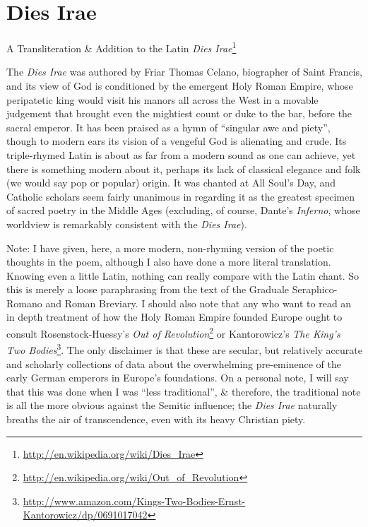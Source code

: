 \section{Dies Irae}

A Transliteration \& Addition to the Latin \emph{Dies Irae}\footnote{\url{http://en.wikipedia.org/wiki/Dies\_Irae}}


\begin{quotex}
The \emph{Dies Irae} was authored by Friar Thomas Celano, biographer of Saint Francis, and its view of God is conditioned by the emergent Holy Roman Empire, whose peripatetic king would visit his manors all across the West in a movable judgement that brought even the mightiest count or duke to the bar, before the sacral emperor. It has been praised as a hymn of ``singular awe and piety'', though to modern ears its vision of a vengeful God is alienating and crude. Its triple-rhymed Latin is about as far from a modern sound as one can achieve, yet there is something modern about it, perhaps its lack of classical elegance and folk (we would say pop or popular) origin. It was chanted at All Soul's Day, and Catholic scholars seem fairly unanimous in regarding it as the greatest specimen of sacred poetry in the Middle Ages (excluding, of course, Dante's \emph{Inferno}, whose worldview is remarkably consistent with the \emph{Dies Irae}).
\end{quotex}


Note: I have given, here, a more modern, non-rhyming version of the poetic thoughts in the poem, although I also have done a more literal translation. Knowing even a little Latin, nothing can really compare with the Latin chant. So this is merely a loose paraphrasing from the text of the Graduale Seraphico-Romano and Roman Breviary. I should also note that any who want to read an in depth treatment of how the Holy Roman Empire founded Europe ought to consult Rosenstock-Huessy's \textit{Out of Revolution}\footnote{\url{http://en.wikipedia.org/wiki/Out\_of\_Revolution}} or Kantorowicz's \textit{The King's Two Bodies}\footnote{\url{http://www.amazon.com/Kings-Two-Bodies-Ernst-Kantorowicz/dp/0691017042}}. The only disclaimer is that these are secular, but relatively accurate and scholarly collections of data about the overwhelming pre-eminence of the early German emperors in Europe's foundations. On a personal note, I will say that this was done when I was ``less traditional'', \& therefore, the traditional note is all the more obvious against the Semitic influence; the \emph{Dies Irae} naturally breaths the air of transcendence, even with its heavy Christian piety.


